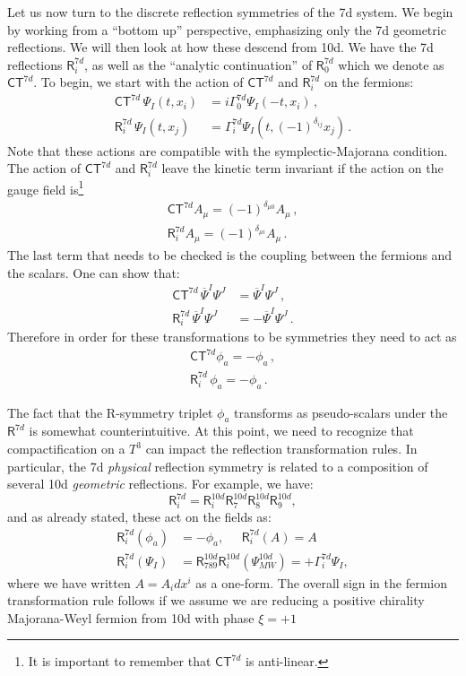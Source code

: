 \documentclass[12pt]{article}%
\numberwithin{equation}{section}
\newcommand{\al}[1]{\begin{align}#1\end{align}}
\renewcommand{\(}{\left(}
\renewcommand{\)}{\right)}
\renewcommand{\[}{\left[}
\renewcommand{\]}{\right]}
\begin{document}
Let us now turn to the discrete reflection symmetries of the 7d system. We begin by working from a ``bottom up'' perspective,
emphasizing only the 7d geometric reflections. We will then look at how these descend from 10d.
We have the 7d reflections $\mathsf{R}^{7d}_i$,
as well as the ``analytic continuation'' of $\mathsf{R}^{7d}_0$ which we denote as $\mathsf{CT}^{7d}$.
To begin, we start with the action of $\mathsf{CT}^{7d}$ and $\mathsf{R}^{7d}_i$ on the fermions:
\al{ \mathsf{CT}^{7d}\,  \Psi_I(t, x_i) &= i\Gamma^{7d}_0 \Psi_I(-t,x_i)\,,\\
\mathsf{R}^{7d}_i\,  \Psi_I(t, x_j) &= \Gamma^{7d}_i \Psi_I(t,(-1)^{\delta_{ij}}x_j)\,.
}
%
Note that these actions are compatible with the symplectic-Majorana condition.
The action of $\mathsf{CT}^{7d}$ and $\mathsf R^{7d}_i$ leave the kinetic term invariant
if the action on the gauge field is\footnote{It is important to remember that $\mathsf{CT}^{7d} $
is anti-linear.}
%
\al{ \mathsf{CT}^{7d} A_\mu = (-1)^{\delta_{\mu 0}}A_\mu\,,\\
 \mathsf{R}^{7d}_i A_\mu = (-1)^{\delta_{\mu i}}A_\mu\,.
}
%
The last term that needs to be checked is the coupling between the fermions and the scalars.
One can show that:
%
\al{ \mathsf{CT}^{7d} \,\overline{\Psi}^I \Psi^J &= \overline{\Psi}^I \Psi^J\,,\\
\mathsf{R}^{7d}_i \,\overline{\Psi}^I \Psi^J &= -\overline{\Psi}^I \Psi^J\,.
}
%
Therefore in order for these transformations to be symmetries they need to act as
%
\al{ \mathsf{CT}^{7d}\phi_a = -\phi_a\,, \label{eqn:triplettransI} \\
 \mathsf{R}^{7d}_i \,\phi_a = -\phi_a\,. \label{eqn:triplettransII}
}

The fact that the R-symmetry triplet $\phi_a$ transforms as pseudo-scalars under the $\mathsf{R}^{7d}$ is
somewhat counterintuitive. At this point, we need to recognize that compactification on a $T^3$ can impact the reflection transformation
rules. In particular, the 7d \textit{physical} reflection symmetry is related to a composition of several 10d \textit{geometric} reflections.
For example, we have:
\begin{equation}
\mathsf{R}^{7d}_{i} =  \mathsf{R}^{10d}_{i}\mathsf{R}^{10d}_{7} \mathsf{R}^{10d}_{8} \mathsf{R}^{10d}_{9} ,
\end{equation}
and as already stated, these act on the fields as:
\begin{align}
\mathsf{R}^{7d}_i(\phi_a) & = -\phi_a, \; \; \; \; \; \mathsf{R}^{7d}_i(A)=A \\
\mathsf{R}^{7d}_i(\Psi_I) & =\mathsf{R}^{10d}_{789}\mathsf{R}^{10d}_i (\Psi^{10d}_{MW})=+ \Gamma^{7d}_i \Psi_I,
\end{align}
where we have written $A = A_i dx^i$ as a one-form. The overall sign in the fermion transformation rule follows if we assume we are reducing a positive chirality Majorana-Weyl fermion from 10d with phase $\xi = +1$
\end{document}
